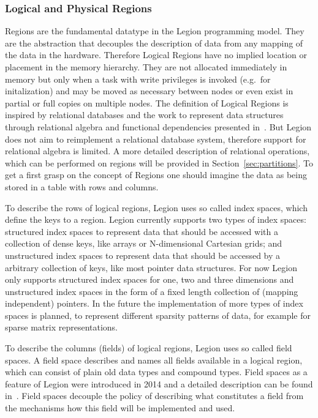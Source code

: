 \documentclass{article}      %
\begin{document}
\subsubsection{Logical and Physical Regions}\label{sec:logicalRegions}
Regions are the fundamental datatype in the Legion programming model.
They are the abstraction that decouples the description of data from any mapping of the data in the hardware.
Therefore Logical Regions have no implied location or placement in the memory hierarchy. They are not allocated immediately in memory but only when a task with write privileges is invoked (e.g.\ for initalization) and may be moved as necessary between nodes or even exist in partial or full copies on multiple nodes.
The definition of Logical Regions is inspired by relational databases and the work to represent data structures through relational algebra and functional dependencies presented in~\cite{hawkins2011data}. 
But Legion does not aim to reimplement a relational database system, therefore support for relational algebra is limited. 
A more detailed description of relational operations, which can be performed on regions will be provided in Section~\ref{sec:partitions}. 
To get a first grasp on the concept of Regions one should imagine the data as being stored in a table with rows and columns.

To describe the rows of logical regions, Legion uses so called index spaces, which define the keys to a region. Legion currently supports two types of index spaces: structured index spaces to represent data that should be accessed with a collection of dense keys, like arrays or N-dimensional Cartesian grids; and unstructured index spaces to represent data that should be accessed by a arbitrary collection of keys, like most pointer data structures. For now Legion only supports structured index spaces for one, two and three dimensions and unstructured index spaces in the form of a fixed length collection of (mapping independent) pointers. In the future the implementation of more types of index spaces is planned, to represent different sparsity patterns of data, for example for sparse matrix representations.

To describe the columns (fields) of logical regions, Legion uses so called field spaces. A field space describes and names all fields available in a logical region, which can consist of plain old data types and compound types. Field spaces as a feature of Legion were introduced in 2014 and a detailed description can be found in~\cite{ExtendingLogicalRegions}. Field spaces decouple the policy of describing what constitutes a field from the mechanisms how this field will be implemented and used.
\end{document}
